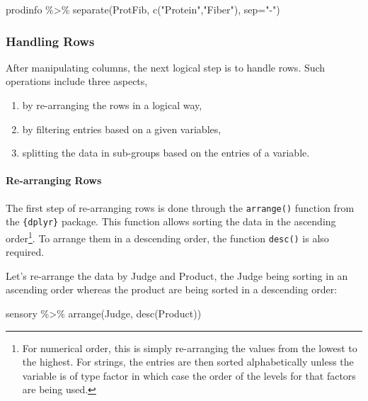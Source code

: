 \documentclass[
]{book}
\newenvironment{Shaded}{\begin{snugshade}}{\end{snugshade}}
\newcommand{\AttributeTok}[1]{\textcolor[rgb]{0.77,0.63,0.00}{#1}}
\newcommand{\FunctionTok}[1]{\textcolor[rgb]{0.00,0.00,0.00}{#1}}
\newcommand{\NormalTok}[1]{#1}
\newcommand{\SpecialCharTok}[1]{\textcolor[rgb]{0.00,0.00,0.00}{#1}}
\newcommand{\StringTok}[1]{\textcolor[rgb]{0.31,0.60,0.02}{#1}}
\providecommand{\tightlist}{%
  \setlength{\itemsep}{0pt}\setlength{\parskip}{0pt}}
\begin{document}
\begin{Shaded}
\begin{Highlighting}[]
\NormalTok{prodinfo }\SpecialCharTok{\%\textgreater{}\%} 
  \FunctionTok{separate}\NormalTok{(ProtFib, }\FunctionTok{c}\NormalTok{(}\StringTok{"Protein"}\NormalTok{,}\StringTok{"Fiber"}\NormalTok{), }\AttributeTok{sep=}\StringTok{"{-}"}\NormalTok{)}
\end{Highlighting}
\end{Shaded}

\hypertarget{handling-rows}{%
\subsubsection{Handling Rows}\label{handling-rows}}

After manipulating columns, the next logical step is to handle rows. Such operations include three aspects,

\begin{enumerate}
\def\labelenumi{\arabic{enumi}.}
\tightlist
\item
  by re-arranging the rows in a logical way,
\item
  by filtering entries based on a given variables,
\item
  splitting the data in sub-groups based on the entries of a variable.
\end{enumerate}

\hypertarget{re-arranging-rows}{%
\paragraph{Re-arranging Rows}\label{re-arranging-rows}}

The first step of re-arranging rows is done through the \texttt{arrange()} function from the \texttt{\{dplyr\}} package. This function allows sorting the data in the ascending order\footnote{For numerical order, this is simply re-arranging the values from the lowest to the highest. For strings, the entries are then sorted alphabetically unless the variable is of type factor in which case the order of the levels for that factors are being used.}. To arrange them in a descending order, the function \texttt{desc()} is also required.

Let's re-arrange the data by Judge and Product, the Judge being sorting in an ascending order whereas the product are being sorted in a descending order:

\begin{Shaded}
\begin{Highlighting}[]
\NormalTok{sensory }\SpecialCharTok{\%\textgreater{}\%} 
  \FunctionTok{arrange}\NormalTok{(Judge, }\FunctionTok{desc}\NormalTok{(Product))}
\end{Highlighting}
\end{Shaded}
\end{document}
